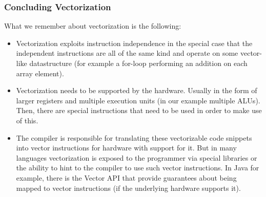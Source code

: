 \documentclass[main.tex]{subfiles}
\begin{document}
\subsubsection{Concluding Vectorization}
What we remember about vectorization is the following:
\begin{itemize}
  \item Vectorization exploits instruction independence in the special case that the independent instructions are all of the same kind and operate on some vector-like datastructure (for example a for-loop performing an addition on each array element).
  \item Vectorization needs to be supported by the hardware. Usually in the form of larger registers and multiple execution units (in our example multiple ALUs). Then, there are special instructions that need to be used in order to make use of this.
  \item The compiler is responsible for translating these vectorizable code snippets into vector instructions for hardware with support for it. But in many languages vectorization is exposed to the programmer via special libraries or the ability to hint to the compiler to use such vector instructions. In Java for example, there is the Vector API that provide guarantees about being mapped to vector instructions (if the underlying hardware supports it).
\end{itemize}
\end{document}
